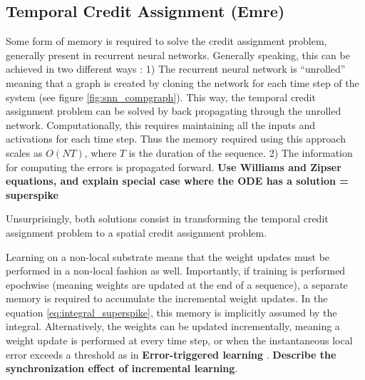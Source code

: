 \documentclass[journal,onecolumn,11pt]{IEEEtran}
\begin{document}
\subsection{Temporal Credit Assignment (Emre)}
Some form of memory is required to solve the credit assignment problem, generally present in recurrent neural networks. 
Generally speaking, this can be achieved in two different ways \cite{Williams_Zipser89_learalgo}:
1) The recurrent neural network is ``unrolled'' meaning that a graph is created by cloning the network for each time step of the system (see figure \ref{fig:snn_compgraph}). This way, the temporal credit assignment problem can be solved by back propagating through the unrolled network. Computationally, this requires maintaining all the inputs and activations for each time step. Thus the memory required using this approach scales as $O(N T)$, where $T$ is the duration of the sequence.
2) The information for computing the errors is propagated forward.
\textbf{Use Williams and Zipser equations, and explain special case where the ODE has a solution = superspike}

Unsurprisingly, both solutions consist in transforming the temporal credit assignment problem to a spatial credit assignment problem.

Learning on a non-local substrate means that the weight updates must be performed in a non-local fashion as well. Importantly, if training is performed epochwise (meaning weights are updated at the end of a sequence), a separate memory is required to accumulate the incremental weight updates. In the equation \ref{eq:integral_superspike}, this memory is implicitly assumed by the integral. Alternatively, the weights can be updated incrementally, meaning a weight update is performed at every time step, or when the instantaneous local error exceeds a threshold as in 
\textbf{Error-triggered learning} \cite{Neftci18_datapowe}.
\textbf{Describe the synchronization effect of incremental learning}.
\end{document}
